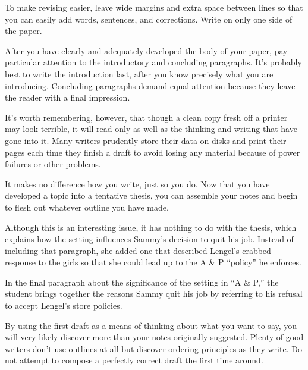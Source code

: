 \qquad [A] To make revising easier, leave wide margins and extra space between lines so that you can easily add words, sentences, and corrections. Write on only one side of the paper.

\qquad [B] After you have clearly and adequately developed the body of your paper, pay particular attention to the introductory and concluding paragraphs. It's probably best to write the introduction last, after you know precisely what you are introducing. Concluding paragraphs demand equal attention because they leave the reader with a final impression.

\qquad [C] It's worth remembering, however, that though a clean copy fresh off a printer may look terrible, it will read only as well as the thinking and writing that have gone into it. Many writers prudently store their data on disks and print their pages each time they finish a draft to avoid losing any material because of power failures or other problems.

\qquad [D] It makes no difference how you write, just so you do. Now that you have developed a topic into a tentative thesis, you can assemble your notes and begin to flesh out whatever outline you have made.

\qquad [E] Although this is an interesting issue, it has nothing to do with the thesis, which explains how the setting influences Sammy's decision to quit his job. Instead of including that paragraph, she added one that described Lengel's crabbed response to the girls so that she could lead up to the A \& P ``policy'' he enforces.

\qquad [F] In the final paragraph about the significance of the setting in ``A \& P,'' the student brings together the reasons Sammy quit his job by referring to his refusal to accept Lengel's store policies.

\qquad [G] By using the first draft as a means of thinking about what you want to say, you will very likely discover more than your notes originally suggested. Plenty of good writers don't use outlines at all but discover ordering principles as they write. Do not attempt to compose a perfectly correct draft the first time around.